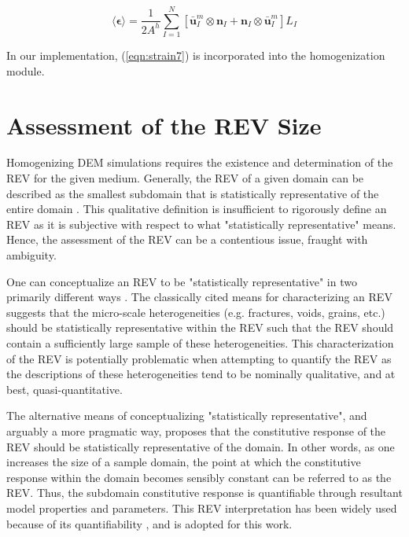 \begin{equation}
\langle\boldsymbol{\epsilon}\rangle=\frac{1}{2A^{h}}\sum_{I=1}^{N}\left[\bar{\mathbf{u}}^m_{I}\otimes\mathbf{n}_{I}+\mathbf{n}_{I}\otimes\bar{\mathbf{u}}^m_{I}\right]L_{I}\label{eqn:strain7}
\end{equation}

In our implementation, (\ref{eqn:strain7}) is incorporated into the homogenization module.

\section{Assessment of the REV Size}

Homogenizing DEM simulations requires the existence and determination of the REV for the given medium. Generally, the REV of a given domain can be described as the smallest subdomain that is statistically representative of the entire domain \citep{Kanit_2003, Gitman_2007}. This qualitative definition is insufficient to rigorously define an REV as it is subjective with respect to what "statistically representative" means. Hence, the assessment of the REV can be a contentious issue, fraught with ambiguity.

One can conceptualize an REV to be "statistically representative" in two primarily different ways \citep{Drugan_1996}. The classically cited means for characterizing an REV suggests that the micro-scale heterogeneities (e.g. fractures, voids, grains, etc.) should be statistically representative within the REV such that the REV should contain a sufficiently large sample of these heterogeneities. This characterization of the REV is potentially problematic when attempting to quantify the REV as the descriptions of these heterogeneities tend to be nominally qualitative, and at best, quasi-quantitative.

The alternative means of conceptualizing "statistically representative", and arguably a more pragmatic way, proposes that the constitutive response of the REV should be statistically representative of the domain. In other words, as one increases the size of a sample domain, the point at which the constitutive response within the domain becomes sensibly constant can be referred to as the REV. Thus, the subdomain constitutive response is quantifiable through resultant model properties and parameters. This REV interpretation has been widely used because of its quantifiability \citep{Kanit_2003, Gitman_2005, Gusev_1997, M_ller_2010}, and is adopted for this work.

